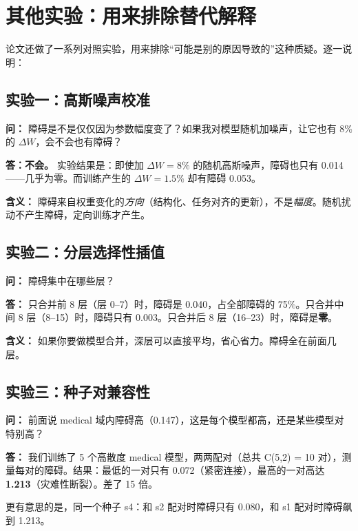 \documentclass[12pt,a4paper]{ctexart}
\begin{document}
\section{其他实验：用来排除替代解释}

论文还做了一系列对照实验，用来排除``可能是别的原因导致的''这种质疑。逐一说明：

\subsection*{实验一：高斯噪声校准}

\textbf{问：} 障碍是不是仅仅因为参数幅度变了？如果我对模型随机加噪声，让它也有 8\% 的 $\Delta W$，会不会也有障碍？

\textbf{答：不会。} 实验结果是：即使加 $\Delta W = 8\%$ 的随机高斯噪声，障碍也只有 0.014——几乎为零。而训练产生的 $\Delta W = 1.5\%$ 却有障碍 0.053。

\textbf{含义：} 障碍来自权重变化的\emph{方向}（结构化、任务对齐的更新），不是\emph{幅度}。随机扰动不产生障碍，定向训练才产生。

\subsection*{实验二：分层选择性插值}

\textbf{问：} 障碍集中在哪些层？

\textbf{答：} 只合并前 8 层（层 0--7）时，障碍是 0.040，占全部障碍的 75\%。只合并中间 8 层（8--15）时，障碍只有 0.003。只合并后 8 层（16--23）时，障碍是\textbf{零}。

\textbf{含义：} 如果你要做模型合并，深层可以直接平均，省心省力。障碍全在前面几层。

\subsection*{实验三：种子对兼容性}

\textbf{问：} 前面说 medical 域内障碍高（0.147），这是每个模型都高，还是某些模型对特别高？

\textbf{答：} 我们训练了 5 个高散度 medical 模型，两两配对（总共 C(5,2) = 10 对），测量每对的障碍。结果：最低的一对只有 0.072（紧密连接），最高的一对高达 \textbf{1.213}（灾难性断裂）。差了 15 倍。

更有意思的是，同一个种子 s4：和 s2 配对时障碍只有 0.080，和 s1 配对时障碍飙到 1.213。
\end{document}
